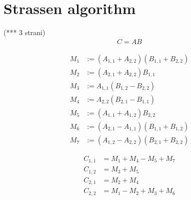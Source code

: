 \documentclass[a4paper,11pt]{article}
\begin{document}
\section{Strassen algorithm}
(*** 3 strani)
\begin{align*}
C=AB
\end{align*}


\begin{align*}
M_{1} &:= (A_{1,1} + A_{2,2})(B_{1,1} + B_{2,2}) \\
M_{2} &:= (A_{2,1} + A_{2,2})B_{1,1} \\
M_{3} &:= A_{1,1}(B_{1,2} - B_{2,2}) \\
M_{4} &:= A_{2,2}(B_{2,1} - B_{1,1}) \\
M_{5} &:= (A_{1,1} + A_{1,2})B_{2,2} \\
M_{6} &:= (A_{2,1} - A_{1,1})(B_{1,1} + B_{1,2}) \\
M_{7} &:= (A_{1,2} - A_{2,2})(B_{2,1} + B_{2,2})
\end{align*}

\begin{align*}
C_{1,1} &= M_{1} + M_{4} - M_{5} + M_{7} \\
C_{1,2} &= M_{3} + M_{5} \\
C_{2,1} &= M_{2} + M_{4} \\
C_{2,2} &= M_{1} - M_{2} + M_{3} + M_{6}
\end{align*}
\end{document}

